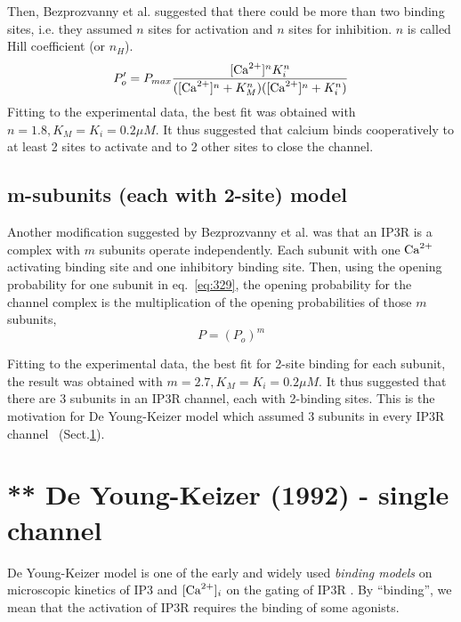 Then, Bezprozvanny et al. \citep{bezprozvanny1991ip3r} suggested that there
could be more than two binding sites, i.e. they assumed $n$ sites for
activation and $n$ sites for inhibition. $n$ is called Hill
coefficient (or $n_H$).
\begin{equation}
  \label{eq:330}
  P'_o =  P_{max} \frac{[\ce{Ca^2+}]^nK^n_i}{([\ce{Ca^2+}]^n+K^n_M)([\ce{Ca^2+}]^n+K_i^n)}
 \end{equation}
Fitting to the experimental data, the best fit was obtained with
$n=1.8, K_M=K_i=0.2\mu M$. It thus suggested that calcium binds
cooperatively to at least 2 sites to activate and to 2 other sites to
close the channel. 

\subsection{m-subunits (each with 2-site) model}

Another modification suggested by Bezprozvanny et al. was that an IP3R
is a complex with $m$ subunits operate independently. Each subunit
with one ${\text{Ca}^{2+}}$ activating binding site and one 
inhibitory binding site. Then, using the opening probability for one
subunit in eq.~\eqref{eq:329}, the opening probability for the channel
complex is the multiplication of the opening probabilities of those
$m$ subunits,
\begin{equation}
  \label{eq:331}
  P = (P_o)^m
\end{equation}

Fitting to the experimental data, the best fit for 2-site binding for each
subunit, the result was obtained with $m=2.7, K_M=K_i=0.2\mu M$. It thus
suggested that there are 3 subunits in an IP3R channel, each with 2-binding
sites.
This is the motivation for De Young-Keizer model which assumed 3 subunits in
every IP3R channel~\cite{deyoung1992spip3} (Sect.\ref{sec:de-young-keizer}).


\section{** De Young-Keizer (1992) - single channel}
\label{sec:de-young-keizer}
\label{sec:IP3R-DeYoung-Keizer-1992}

De Young-Keizer model is one of the early and widely used {\it binding models}
on microscopic kinetics of IP3 and $[{\text{Ca}^{2+}}]_i$ on the gating of IP3R
\citep{deyoung1992spip3}. By ``binding'', we mean that the activation of IP3R
requires the binding of some agonists. 

